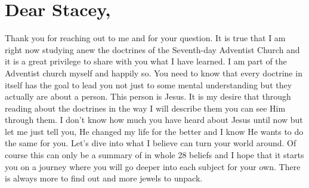 \section{Dear Stacey,}
Thank you for reaching out to me and for your question. It is true that I am right now studying anew the doctrines of the Seventh-day Adventist Church and it is a great privilege to share with you what I have learned.
I am part of the Adventist church myself and happily so. You need to know that every doctrine in itself has the goal to lead you not just to some mental understanding but they actually are about a person. This person is Jesus. It is my desire that through reading about the doctrines in the way I will describe them you can see Him through them. I don't know how much you have heard about Jesus until now but let me just tell you, He changed my life for the better and I know He wants to do the same for you. Let's dive into what I believe can turn your world around. Of course this can only be a summary of in whole 28 beliefs and I hope that it starts you on a journey where you will go deeper into each subject for your own. There is always more to find out and more jewels to unpack.

